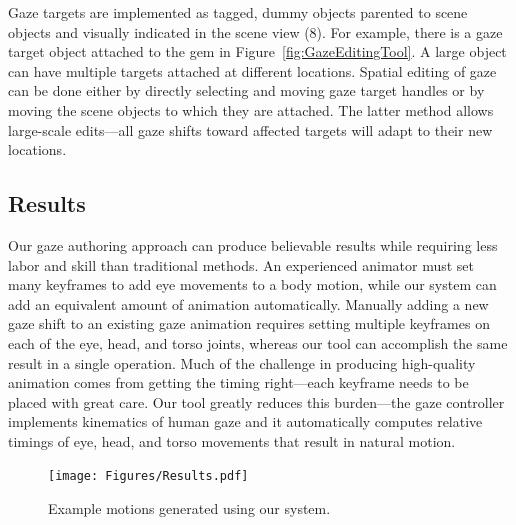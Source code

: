 Gaze targets are implemented as tagged, dummy objects parented to scene objects and visually indicated in the scene view (8). For example, there is a gaze target object attached to the gem in Figure~\ref{fig:GazeEditingTool}. A large object can have multiple targets attached at different locations. Spatial editing of gaze can be done either by directly selecting and moving gaze target handles or by moving the scene objects to which they are attached. The latter method allows large-scale edits---all gaze shifts toward affected targets will adapt to their new locations.

\subsection{Results}
\label{sec:GazeEditingResults}

Our gaze authoring approach can produce believable results while requiring less labor and skill than traditional methods. An experienced animator must set many keyframes to add eye movements to a body motion, while our system can add an equivalent amount of animation automatically. Manually adding a new gaze shift to an existing gaze animation requires setting multiple keyframes on each of the eye, head, and torso joints, whereas our tool can accomplish the same result in a single operation. Much of the challenge in producing high-quality animation comes from getting the timing right---each keyframe needs to be placed with great care. Our tool greatly reduces this burden---the gaze controller implements kinematics of human gaze and it automatically computes relative timings of eye, head, and torso movements that result in natural motion.

\begin{figure}
\centering
\texttt{[image: Figures/Results.pdf]}
\caption{Example motions generated using our system.}
\label{fig:Results}
\end{figure}

